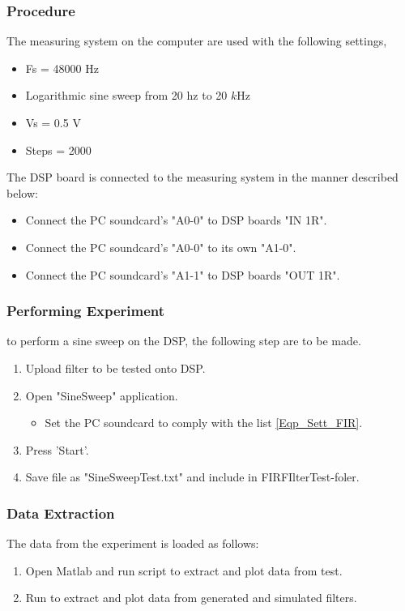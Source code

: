 \subsubsection{Procedure}\label{Eqp_Sett_FIR}

The measuring system on the computer are used with the following settings,
\begin{itemize}
	\item Fs = 48000 Hz
	\item Logarithmic sine sweep from 20 hz to 20 $k$Hz
	\item Vs = 0.5 V
	\item Steps = 2000
\end{itemize}

The DSP board is connected to the measuring system in the manner described below:
	\begin{itemize}
		\item Connect the PC soundcard's "A0-0" to DSP boards "IN 1R".
		\item Connect the PC soundcard's "A0-0" to its own "A1-0".
		\item Connect the PC soundcard's "A1-1" to DSP boards "OUT 1R".
	\end{itemize}
	
\subsubsection{Performing Experiment}
to perform a sine sweep on the DSP, the following step are to be made.
	\begin{enumerate}
		\item Upload filter to be tested onto DSP.
		\item Open "SineSweep" application.
		\begin{itemize}
			 \item Set the PC soundcard to comply with the list \autoref{Eqp_Sett_FIR}.
		\end{itemize}
		\item Press 'Start'.
		\item Save file as "SineSweepTest.txt" and include in FIRFIlterTest-foler.
	\end{enumerate}


\subsubsection{Data Extraction}
The data from the experiment is loaded as follows:
	\begin{enumerate}
		\item Open Matlab and run script  to extract and plot data from test.
		\item Run  to extract and plot data from generated and simulated filters.
	\end{enumerate}

